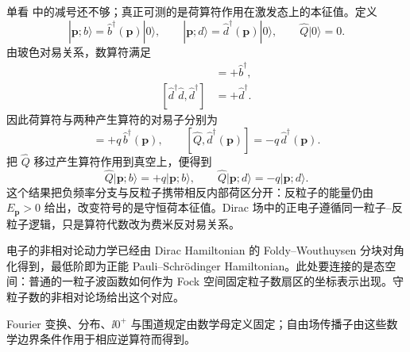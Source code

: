\begin{exbox}[粒子与反粒子的 $U(1)$ 荷]
单看 中的减号还不够；真正可测的是荷算符作用在激发态上的本征值。定义
\begin{equation*}
 |\mathbf p;b\rangle
 =\hat b^\dagger(\mathbf p)|0\rangle,
 \qquad
 |\mathbf p;d\rangle
 =\hat d^\dagger(\mathbf p)|0\rangle,
 \qquad \hat Q|0\rangle=0.
\end{equation*}
由玻色对易关系，数算符满足
\begin{align*}
 [\hat b^\dagger\hat b,\hat b^\dagger]&=+\hat b^\dagger,\\
 [\hat d^\dagger\hat d,\hat d^\dagger]&=+\hat d^\dagger.
\end{align*}
因此荷算符与两种产生算符的对易子分别为
\begin{equation*}
 [\hat Q,\hat b^\dagger(\mathbf p)]
 =+q\,\hat b^\dagger(\mathbf p),
 \qquad
 [\hat Q,\hat d^\dagger(\mathbf p)]
 =-q\,\hat d^\dagger(\mathbf p).
\end{equation*}
把 $\hat Q$ 移过产生算符作用到真空上，便得到
\begin{equation*}
 \hat Q|\mathbf p;b\rangle=+q|\mathbf p;b\rangle,
 \qquad
 \hat Q|\mathbf p;d\rangle=-q|\mathbf p;d\rangle.
\end{equation*}
这个结果把负频率分支与反粒子携带相反内部荷区分开：反粒子的能量仍由 $E_{\mathbf p}>0$ 给出，改变符号的是守恒荷本征值。Dirac 场中的正电子遵循同一粒子--反粒子逻辑，只是算符代数改为费米反对易关系。
\end{exbox}



电子的非相对论动力学已经由 Dirac Hamiltonian 的 Foldy--Wouthuysen 分块对角化得到，最低阶即为正能 Pauli--Schr\"odinger Hamiltonian。此处要连接的是态空间：普通的一粒子波函数如何作为 Fock 空间固定粒子数扇区的坐标表示出现。守粒子数的非相对论场给出这个对应。


Fourier 变换、分布、$\ii0^+$ 与围道规定由数学母定义固定；自由场传播子由这些数学边界条件作用于相应逆算符而得到。

